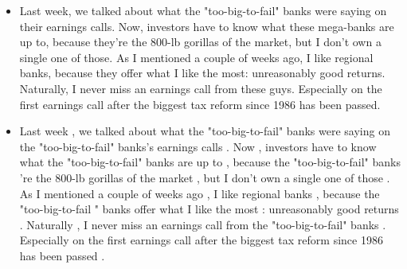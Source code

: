 \begin{itemize}
	\item Last week, we talked about what the "too-big-to-fail" banks were saying on their earnings calls. Now, investors have to know what these mega-banks are up to, because they're the 800-lb gorillas of the market, but I don't own a single one of those. As I mentioned a couple of weeks ago, I like regional banks, because they offer what I like the most: unreasonably good returns. Naturally, I never miss an earnings call from these guys. Especially on the first earnings call after the biggest tax reform since 1986 has been passed.
	\item Last week , we talked about what the "too-big-to-fail" banks were saying on the "too-big-to-fail" banks's earnings calls . Now , investors have to know what the "too-big-to-fail" banks are up to , because the "too-big-to-fail" banks 're the 800-lb gorillas of the market , but I don't own a single one of those . As I mentioned a couple of weeks ago , I like regional banks , because the "too-big-to-fail " banks offer what I like the most : unreasonably good returns . Naturally , I never miss an earnings call from the "too-big-to-fail" banks . Especially on the first earnings call after the biggest tax reform since 1986 has been passed .
\end{itemize}

